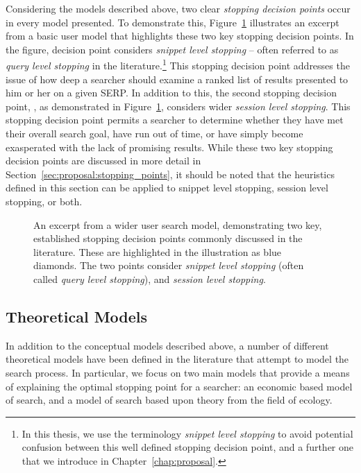 \noindent
{}
Considering the models described above, two clear \emph{stopping decision points} occur in every model presented. To demonstrate this, Figure~\ref{fig:model_two_points} illustrates an excerpt from a basic user model that highlights these two key stopping decision points. In the figure, decision point  considers \emph{snippet level stopping} -- often referred to as \emph{query level stopping} in the literature.\footnote{In this thesis, we use the terminology \emph{snippet level stopping} to avoid potential confusion between this well defined stopping decision point, and a further one that we introduce in Chapter~\ref{chap:proposal}.} This stopping decision point addresses the issue of how deep a searcher should examine a ranked list of results presented to him or her on a given SERP. In addition to this, the second stopping decision point, , as demonstrated in Figure~\ref{fig:model_two_points}, considers wider \emph{session level stopping}. This stopping decision point permits a searcher to determine whether they have met their overall search goal, have run out of time, or have simply become exasperated with the lack of promising results. While these two key stopping decision points are discussed in more detail in Section~\ref{sec:proposal:stopping_points}, it should be noted that the heuristics defined in this section can be applied to snippet level stopping, session level stopping, or both.

\begin{figure}[t!]
    \centering
    \caption[Two main stopping decision points of the search process]{An excerpt from a wider user search model, demonstrating two key, established stopping decision points commonly discussed in the literature. These are highlighted in the illustration as {\color{dmax_lightblue}blue} diamonds. The two points consider  \emph{snippet level stopping} (often called \emph{query level stopping}), and  \emph{session level stopping}.}
    \label{fig:model_two_points}
\end{figure}

\subsection{Theoretical Models}
In addition to the conceptual models described above, a number of different theoretical models have been defined in the literature that attempt to model the search process. In particular, we focus on two main models that provide a means of explaining the optimal stopping point for a searcher: an economic based model of search, and a model of search based upon theory from the field of ecology.

